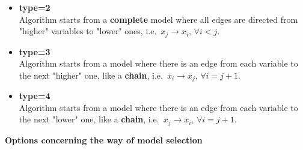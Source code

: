 \begin{itemize}
\begin{itemize}
\item  {\bf type=2} \\
    Algorithm starts from a {\bf complete} model where all edges are directed
    from "higher" variables to "lower" ones, i.e.~$x_j \rightarrow x_i, \, \forall i<j$.
\item  {\bf type=3} \\
    Algorithm starts from a model where there is an edge from each variable to
    the next "higher" one, like a {\bf chain}, i.e.~$x_i \rightarrow x_j, \, \forall i=j+1$.
\item  {\bf type=4} \\
    Algorithm starts from a model where there is an edge from each variable to
    the next "lower" one, like a {\bf chain}, i.e.~$x_j \rightarrow x_i, \, \forall i=j+1$.
\end{itemize}
\end{itemize}

\vspace{1cm}

{\bf Options concerning the way of model selection}

